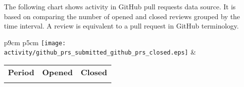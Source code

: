 The following chart shows activity in GitHub pull requests data source. It is based on comparing the number of opened and closed reviews grouped by the time interval. A review is equivalent to a pull request in GitHub terminology.

\begin{tabular}{p{9cm} p{5cm}}
	\vspace{0pt} 
	\hspace*{-6cm}  
	\texttt{[image: activity/github\_prs\_submitted\_github\_prs\_closed.eps]}
	& 
	\vspace{0pt}
	\begin{tabular}{l|r|r|}%
		\bfseries Period & \bfseries Opened & \bfseries Closed %
		\csvreader[head to column names]{activity/github_prs_submitted_github_prs_closed.csv}{}%
		{\\\Date & \submitted & \closed}
	\end{tabular}
\end{tabular}